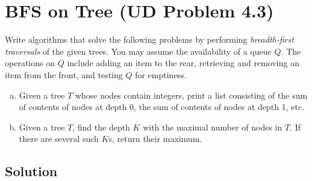 
\section{BFS on Tree (UD Problem 4.3)}

Write algorithms that solve the following problems by performing \emph{breadth-first traversals} of the given trees. 
You may assume the availability of a queue $Q$. 
The operations on $Q$ include adding an item to the rear, 
retrieving and removing an item from the front, and testing $Q$ for emptiness.
    
\begin{enumerate}[(a)]
  \item Given a tree $T$ whose nodes contain integers, 
    print a list consisting of the sum of contents of nodes at depth 0, 
    the sum of contents of nodes at depth 1, etc.
  \item Given a tree $T$, find the depth $K$ with the maximal number of nodes in $T$. 
    If there are several such $K$s, return their maximum.
\end{enumerate}

\subsection{Solution}




